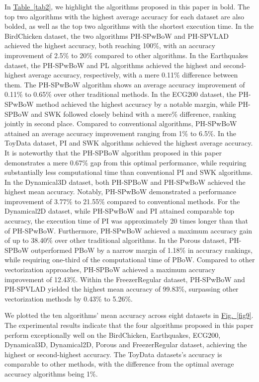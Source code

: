 \documentclass[5GeSdc,ASOC,numref,printGA,printHL,CASflow,nocrossmark,longtitle,PROOF]{/usr/local/texlive/iTemplates/01-Templates/01-Els-Jnl/01-Standard_Templates/V1/ELS_MDL5-V1-6}
\begin{document}
\begin{articlestyle}
In \hyperref[tab2]{Table~\ref{tab2}}, we highlight the algorithms proposed in this paper in bold. The top two algorithms with the highest average accuracy for each dataset are also bolded, as well as the top two algorithms with the shortest execution time. {In the BirdChicken dataset, the two algorithms PH-SPwBoW and PH-SPVLAD achieved the highest accuracy, both reaching 100\%, with an accuracy improvement of 2.5\% to 20\% compared to other algorithms. In the Earthquakes dataset, the PH-SPwBoW and PL algorithms achieved the highest and second-highest average accuracy, respectively, with a mere 0.11\% difference between them. The PH-SPwBoW algorithm shows an average accuracy improvement of 0.11\% to 0.65\% over other traditional methods. In the ECG200 dataset, the PH-SPwBoW method achieved the highest accuracy by a notable margin, while PH-SPBoW and SWK followed closely behind with a mere\% difference, ranking jointly in second place. Compared to conventional algorithms, PH-SPwBoW attained an average accuracy improvement ranging from 1\% to 6.5\%. In the ToyData dataset, PI and SWK algorithms achieved the highest average accuracy. It is noteworthy that the PH-SPBoW algorithm proposed in this paper demonstrates a mere 0.67\% gap from this optimal performance, while requiring substantially less computational time than conventional PI and SWK algorithms. In the Dynamical3D dataset, both PH-SPBoW and PH-SPwBoW achieved the highest mean accuracy. Notably, PH-SPwBoW demonstrated a performance improvement of 3.77\% to 21.55\% compared to conventional methods. For the Dynamical2D dataset, while PH-SPwBoW and PI attained comparable top accuracy, the execution time of PI was approximately 20 times longer than that of PH-SPwBoW. Furthermore, PH-SPwBoW achieved a maximum accuracy gain of up to 38.40\% over other traditional algorithms. In the Porous dataset, PH-SPBoW outperformed PBoW by a narrow margin of 1.18\% in accuracy rankings, while requiring  one-third of the computational time of PBoW. Compared to other vectorization approaches, PH-SPBoW achieved a maximum accuracy improvement of 12.43\%. Within the FreezerRegular dataset, PH-SPwBoW and PH-SPVLAD yielded the highest mean accuracy of 99.83\%, surpassing other vectorization methods by 0.43\% to 5.26\%.}

{We plotted the ten algorithms' mean accuracy across eight datasets in \hyperref[fig9]{Fig.~\ref{fig9}}. The experimental results indicate that the four algorithms proposed in this paper perform exceptionally well on the BirdChicken, Earthquakes, ECG200, Dynamical3D, Dynamical2D, Porous and FreezerRegular dataset, achieving the highest or second-highest accuracy. The ToyData datasets's accuracy is comparable to other methods, with the difference from the optimal average accuracy algorithms being  1\%.}\enlargethispage*{-6pt}


\end{articlestyle}
\end{document}
